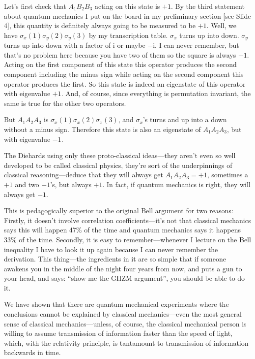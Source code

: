 \documentclass[12pt,nofootinbib]{revtex4}
\renewcommand{\i}{\text{i}}
\begin{document}
Let's first check that $A_1B_2B_3$ acting on this state is $+1$.
By the third statement about quantum mechanics I put on the board in my preliminary section [see Slide 4], this quantity is definitely always going to be measured to be $+1$. Well, we have $\sigma_x(1)\sigma_y(2)\sigma_y(3)$ by my transcription table. $\sigma_x$ turns up into down. $\sigma_y$ turns up into down with a factor of $\i$ or maybe $-\i$, I can never remember,
but that's no problem here because you have two of them so the square is always $-1$.  Acting on the first component of this state this operator produces the second component including the minus sign while acting on the second component this operator produces the first. So this state is indeed an eigenstate of this operator with eigenvalue $+1$. And, of course, since everything is permutation invariant, the same is true for the other two operators.

But $A_1A_2A_3$ is $\sigma_x(1)\sigma_x(2)\sigma_x(3)$, and $\sigma_x$'s turns and up into a down without a minus sign. Therefore this state is also an eigenstate of $A_1A_2A_3$, but with eigenvalue $-1$.

The Diehards using only these proto-classical ideas---they aren't even so well developed to be called classical physics, they're sort of the underpinnings of classical reasoning---deduce that they will always get $A_1A_2A_3=+1$, sometimes a $+1$ and two $-1$'s, but always $+1$. In fact, if quantum mechanics is right, they will always get $-1$.

This is pedagogically superior to the original Bell argument for two reasons: Firstly, it doesn't involve correlation coefficients---it's not that classical mechanics says this will happen 47\% of the time and quantum mechanics says it happens 33\% of the time. Secondly, it is easy to remember---whenever I lecture on the Bell inequality I have to look it up again because I can never remember the derivation. This thing---the ingredients in it are so simple that if someone awakens you in the middle of the night four years from now, and puts a gun to your head, and says: ``show me the GHZM argument'', you should be able to do it.

We have shown that there are quantum mechanical experiments where the conclusions cannot be explained by classical mechanics---even the most general sense of classical mechanics---unless, of course, the classical mechanical person is willing to assume transmission of information faster than the speed of light, which, with the relativity principle, is tantamount to transmission of information backwards in time.
\end{document}
